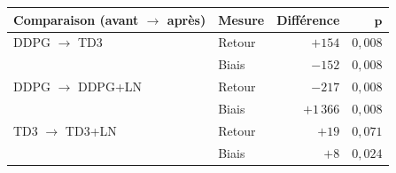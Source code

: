 \begin{tabular}{@{}llrr@{}}
\toprule
\textbf{Comparaison (avant $\to$ après)} & \textbf{Mesure} & \textbf{Différence} & $\boldsymbol p$ \\
\midrule
DDPG $\to$ TD3 & Retour & $+154$ & $0{,}008$ \\
 & Biais & $-152$ & $0{,}008$ \\
DDPG $\to$ DDPG+LN & Retour & $-217$ & $0{,}008$ \\
 & Biais & $+1\,366$ & $0{,}008$ \\
TD3 $\to$ TD3+LN & Retour & $+19$ & $0{,}071$ \\
 & Biais & $+8$ & $0{,}024$ \\
\bottomrule
\end{tabular}
